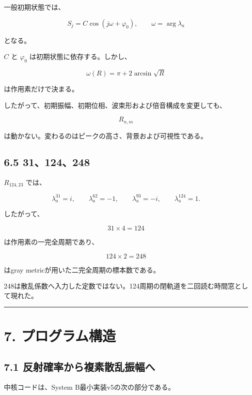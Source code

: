 \documentclass[
  10pt,
  a4paper,
]{article}
\begin{document}
一般初期状態では、

\[
S_j=C\cos(j\omega+\varphi_0),
\qquad
\omega=\arg\lambda_a
\]

となる。

\(C\) と \(\varphi_0\) は初期状態に依存する。しかし、

\[
\omega(R)=\pi+2\arcsin\sqrt R
\]

は作用素だけで決まる。

したがって、初期振幅、初期位相、波束形および倍音構成を変更しても、

\[
R_{n,m}
\]

は動かない。変わるのはピークの高さ、背景および可視性である。

\subsection{6.5 31、124、248}\label{section}

\(R_{124,23}\) では、

\[
\lambda_a^{31}=i,
\qquad
\lambda_a^{62}=-1,
\qquad
\lambda_a^{93}=-i,
\qquad
\lambda_a^{124}=1.
\]

したがって、

\[
31\times4=124
\]

は作用素の一完全周期であり、

\[
124\times2=248
\]

はgray metricが用いた二完全周期の標本数である。

248は散乱係数へ入力した定数ではない。124周期の閉軌道を二回読む時間窓として現れた。

\begin{center}\rule{0.5\linewidth}{0.5pt}\end{center}

\section{7.
プログラム構造}\label{ux30d7ux30edux30b0ux30e9ux30e0ux69cbux9020}

\subsection{7.1
反射確率から複素散乱振幅へ}\label{ux53cdux5c04ux78baux7387ux304bux3089ux8907ux7d20ux6563ux4e71ux632fux5e45ux3078}

中核コードは、System B最小実装v5の次の部分である。
\end{document}
